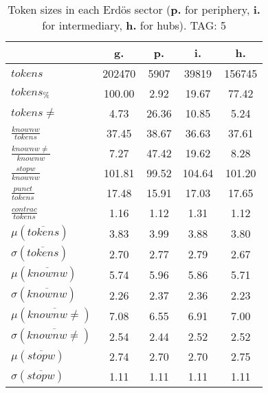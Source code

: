 \begin{table}[h!]
\begin{center}
\begin{tabular}{| l || c | c | c | c |}\hline
 & {\bf g.} & {\bf p.} & {\bf i.} & {\bf h.} \\\hline\hline
$tokens$ & 202470  & 5907  & 39819  & 156745 \\
$tokens_{\%}$ & 100.00  & 2.92  & 19.67  & 77.42 \\
$tokens \neq$ & 4.73  & 26.36  & 10.85  & 5.24 \\\hline
$\frac{knownw}{tokens}$ & 37.45  & 38.67  & 36.63  & 37.61 \\
$\frac{knownw \neq}{knownw}$ & 7.27  & 47.42  & 19.62  & 8.28 \\\hline
$\frac{stopw}{knownw}$ & 101.81  & 99.52  & 104.64  & 101.20 \\
$\frac{punct}{tokens}$ & 17.48  & 15.91  & 17.03  & 17.65 \\
$\frac{contrac}{tokens}$ & 1.16  & 1.12  & 1.31  & 1.12 \\\hline\hline
$\mu(\overline{tokens})$ & 3.83  & 3.99  & 3.88  & 3.80 \\
$\sigma(\overline{tokens})$ & 2.70  & 2.77  & 2.79  & 2.67 \\\hline
$\mu(\overline{knownw})$ & 5.74  & 5.96  & 5.86  & 5.71 \\
$\sigma(\overline{knownw})$ & 2.26  & 2.37  & 2.36  & 2.23 \\\hline
$\mu(\overline{knownw \neq})$ & 7.08  & 6.55  & 6.91  & 7.00 \\
$\sigma(\overline{knownw \neq})$ & 2.54  & 2.44  & 2.52  & 2.52 \\\hline
$\mu(\overline{stopw})$ & 2.74  & 2.70  & 2.70  & 2.75 \\
$\sigma(\overline{stopw})$ & 1.11  & 1.11  & 1.11  & 1.11 \\\hline
\end{tabular}
\caption{Token sizes in each Erd\"os sector ({{\bf p.}} for periphery, {{\bf i.}} for intermediary, {{\bf h.}} for hubs). TAG: 5}
\end{center}
\end{table}
